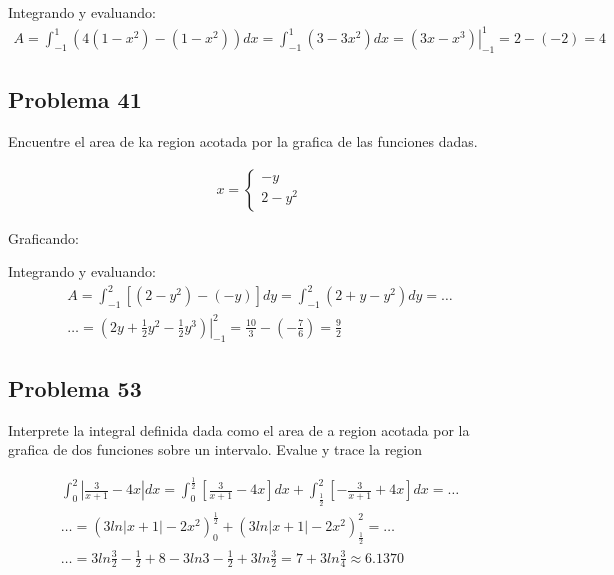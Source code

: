 \documentclass{article}
\begin{document}
Integrando y evaluando:
\begin{align*}
  A = \int_{-1}^{1} (4(1-x^2)-(1-x^2))dx = \int_{-1}^{1} (3-3x^2)dx = \left.(3x-x^3)\right|_{-1}^{1} = 2-(-2) = 4
\end{align*}

\subsection{Problema 41}
Encuentre el area de ka region acotada por la grafica de las funciones dadas.

\begin{align*}
  x =
  \begin{cases}
    -y \\2-y^2
  \end{cases}
\end{align*}

Graficando:
\begin{center}
\end{center}
Integrando y evaluando:
\begin{align*}
  A = \int_{-1}^{2} [(2-y^2)-(-y)]dy = \int_{-1}^{2} (2+y-y^2)dy = \dots \\ \dots = \left.\left(2y+\frac{1}{2}y^2 - \frac{1}{2}y^3\right)\right|_{-1}^{2} = \frac{10}{3} - \left(-\frac{7}{6}\right) = \frac{9}{2}
\end{align*}

\subsection{Problema 53}
Interprete la integral definida dada como el area de a region acotada por la grafica de dos funciones sobre un intervalo. Evalue y trace la region

\begin{align*}
  \int_{0}^{2}\left|\frac{3}{x+1}-4x\right|dx = \int_{0}^{\frac{1}{2}}\left[\frac{3}{x+1}-4x\right]dx + \int_{\frac{1}{2}}^{2} \left[-\frac{3}{x+1}+4x\right]dx = \dots \\ \dots = (3ln|x+1|-2x^2)_{0}^{\frac{1}{2}} + (3ln|x+1|-2x^2)_{\frac{1}{2}}^{2} =\dots \\ \dots = 3ln\frac{3}{2}-\frac{1}{2}+8-3ln3-\frac{1}{2}+3ln\frac{3}{2} = 7+3ln\frac{3}{4} \approx 6.1370
\end{align*}
\end{document}
